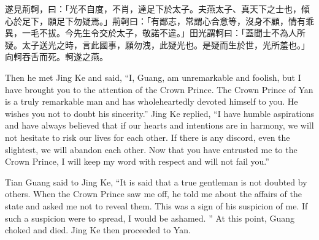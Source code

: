 \documentclass[12pt]{book}
\begin{document}
\Columns
\begin{pairs}
\begin{Rightside}
\begin{chinese}
\beginnumbering
\pstart
遂見荊軻，曰：「光不自度，不肖，達足下於太子。夫燕太子、真天下之士也，傾心於足下，願足下勿疑焉。」荊軻曰：「有鄙志，常謂心合意等，沒身不顧，情有乖異，一毛不拔。今先生令交於太子，敬諾不違。」田光謂軻曰：「蓋聞士不為人所疑。太子送光之時，言此國事，願勿洩，此疑光也。是疑而生於世，光所羞也。」向軻吞舌而死。軻遂之燕。
\pend
\endnumbering
\end{chinese}
\end{Rightside}
\begin{Leftside}
\begin{fioesjfsoeifj}
\beginnumbering
\pstart
Then he met Jing Ke and said, ``I, Guang, am unremarkable and foolish, but I have brought you to the attention of the Crown Prince. The Crown Prince of Yan is a truly remarkable man and has wholeheartedly devoted himself to you. He wishes you not to doubt his sincerity.'' Jing Ke replied, ``I have humble aspirations and have always believed that if our hearts and intentions are in harmony, we will not hesitate to risk our lives for each other. If there is any discord, even the slightest, we will abandon each other. Now that you have entrusted me to the Crown Prince, I will keep my word with respect and will not fail you.''

Tian Guang said to Jing Ke, ``It is said that a true gentleman is not doubted by others. When the Crown Prince saw me off, he told me about the affairs of the state and asked me not to reveal them. This was a sign of his suspicion of me. If such a suspicion were to spread, I would be ashamed. '' At this point, Guang choked and died. Jing Ke then proceeded to Yan.
\pend
\endnumbering
\end{fioesjfsoeifj}
\end{Leftside}
\end{pairs}
\Columns
\end{document}

